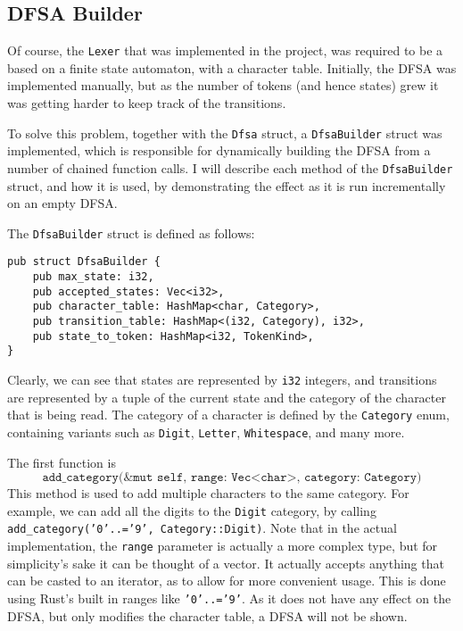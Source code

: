 \documentclass{article}
\newcommand{\code}[1]{\texttt{#1}}
\begin{document}
\newpage

\subsection{DFSA Builder}

Of course, the \code{Lexer} that was implemented in the project, was required to
be a based on a finite state automaton, with a character table. Initially, the
DFSA was implemented manually, but as the number of tokens (and hence states)
grew it was getting harder to keep track of the transitions.

To solve this problem, together with the \code{Dfsa} struct, a
\code{DfsaBuilder} struct was implemented, which is responsible for dynamically
building the DFSA from a number of chained function calls. I will describe each
method of the \code{DfsaBuilder} struct, and how it is used, by demonstrating
the effect as it is run incrementally on an empty DFSA.


The \code{DfsaBuilder} struct is defined as follows:

\begin{mainbox}{}
    \lstset{xleftmargin=0cm}
    \begin{lstlisting}
pub struct DfsaBuilder {
    pub max_state: i32,
    pub accepted_states: Vec<i32>,
    pub character_table: HashMap<char, Category>,
    pub transition_table: HashMap<(i32, Category), i32>,
    pub state_to_token: HashMap<i32, TokenKind>,
}
    \end{lstlisting}
\end{mainbox}

Clearly, we can see that states are represented by \code{i32} integers, and
transitions are represented by a tuple of the current state and the category of
the character that is being read. The category of a character is defined by the
\code{Category} enum, containing variants such as \code{Digit}, \code{Letter},
\code{Whitespace}, and many more.


The first function is $$\code{add\_category(\&mut self, range: Vec<char>,
        category: Category)}$$  This method is used to add multiple characters to the
same category.  For example, we can add all the digits to the \code{Digit}
category, by calling \code{add\_category('0'..='9', Category::Digit)}. Note that
in the actual implementation, the \code{range} parameter is actually a more
complex type, but for simplicity's sake it can be thought of a vector. It
actually accepts anything that can be casted to an iterator, as to allow for
more convenient usage. This is done using Rust's built in ranges like
\code{'0'..='9'}. As it does not have any effect on the DFSA, but only modifies
the character table, a DFSA will not be shown.
\end{document}
